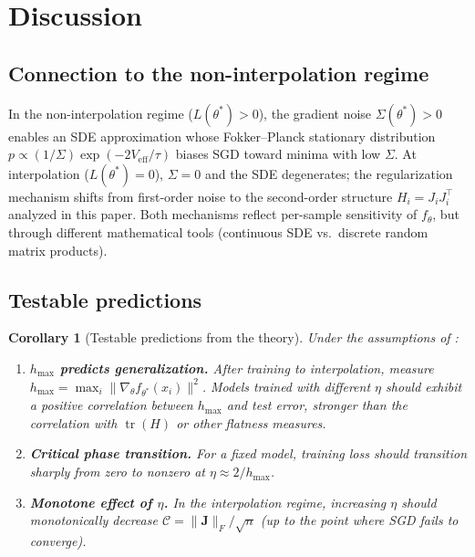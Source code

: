 \documentclass[11pt,a4paper]{article}
\newtheorem{corollary}[theorem]{Corollary}
\theoremstyle{definition}
\theoremstyle{remark}
\DeclareMathOperator{\tr}{tr}
\newcommand{\cC}{\mathcal{C}}
\newcommand{\bJ}{\mathbf{J}}
\begin{document}
\section{Discussion}\label{sec:discussion}

\subsection{Connection to the non-interpolation regime}\label{ssec:non-interp}

In the non-interpolation regime ($L(\theta^*) > 0$), the gradient noise
$\Sigma(\theta^*) > 0$ enables an SDE approximation whose Fokker--Planck
stationary distribution $p \propto (1/\Sigma)\exp(-2V_{\mathrm{eff}}/\tau)$
biases SGD toward minima with low $\Sigma$.  At interpolation
($L(\theta^*) = 0$), $\Sigma = 0$ and the SDE degenerates; the
regularization mechanism shifts from first-order noise to the second-order
structure $H_i = J_i J_i^\top$ analyzed in this paper.  Both mechanisms
reflect per-sample sensitivity of $f_\theta$, but through different
mathematical tools (continuous SDE vs.\ discrete random matrix products).

\subsection{Testable predictions}

\begin{corollary}[Testable predictions from the theory]\label{cor:testable}
  Under the assumptions of :
  \begin{enumerate}[label=(G\arabic*)]
    \item \label{pred:hmax}
      \textbf{$h_{\max}$ predicts generalization.}\;
      After training to interpolation, measure
      $h_{\max} = \max_i \|\nabla_\theta f_{\theta^*}(x_i)\|^2$.
      Models trained with different $\eta$ should exhibit a positive correlation
      between $h_{\max}$ and test error, stronger than the correlation with
      $\tr(H)$ or other flatness measures.

    \item \label{pred:phase}
      \textbf{Critical phase transition.}\;
      For a fixed model, training loss should transition sharply from zero to nonzero
      at $\eta \approx 2/h_{\max}$.

    \item \label{pred:eta-mono}
      \textbf{Monotone effect of $\eta$.}\;
      In the interpolation regime, increasing $\eta$ should monotonically decrease
      $\cC = \|\bJ\|_F/\sqrt{n}$ (up to the point where SGD fails to converge).
  \end{enumerate}
\end{corollary}
\end{document}
